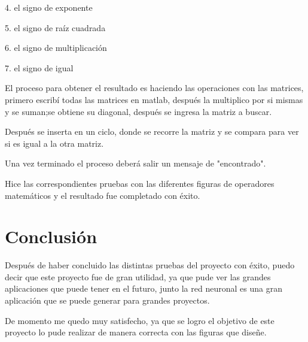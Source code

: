 \documentclass{article}
\begin{document}
4. el signo de exponente

5. el signo de raíz cuadrada

6. el signo de multiplicación

7. el signo de igual

El proceso para obtener el resultado es haciendo las operaciones con las matrices, primero escribí todas las matrices en matlab, después la multiplico por si mismas y se suman;se obtiene su diagonal, después se ingresa la matriz a buscar.

Después se inserta en un ciclo, donde se recorre la matriz y se compara para ver si es igual a la otra matriz.

Una vez terminado el proceso deberá salir un mensaje de "encontrado".


Hice las correspondientes pruebas con las diferentes figuras de operadores matemáticos y el resultado fue completado con éxito.





\section{Conclusión}

Después de haber concluido las distintas pruebas del proyecto con éxito, puedo decir que este proyecto fue de gran utilidad, ya que pude ver las grandes aplicaciones que puede tener en el futuro, junto la red neuronal es una gran aplicación que se puede generar para grandes proyectos.


De momento me quedo muy satisfecho, ya que se logro el objetivo de este proyecto lo pude realizar de manera correcta con las figuras que diseñe.
\end{document}
